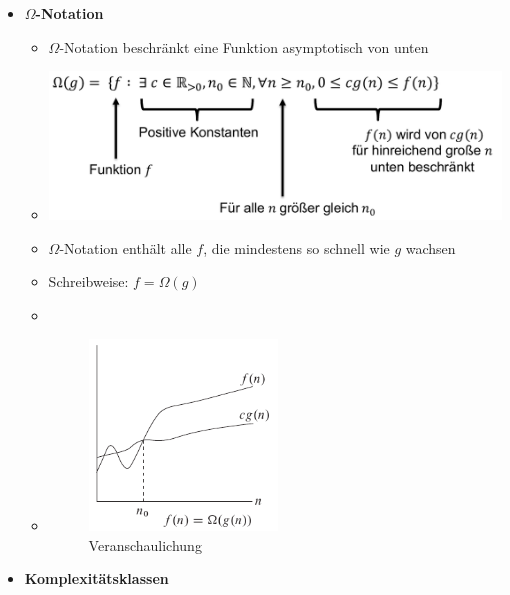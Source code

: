 \documentclass[
    12pt,
    a4paper,
    ngerman,
    color=3b,%
    marginpar=false,
    colorback=false,
    leqno,
]{tudaexercise}
\begin{document}
\begin{itemize}
    \item \textbf{$\Omega$-Notation}
          \begin{itemize}
              \item $\Omega$-Notation beschränkt eine Funktion asymptotisch von unten
              \item[] \includegraphics[width=12cm]{pictures/omegaNotation.pdf}
              \item $\Omega$-Notation enthält alle $f$, die mindestens so schnell wie $g$ wachsen
              \item Schreibweise: $f = \Omega(g)$
              \item[]
              \item[]
                    \begin{minipage}{0.3\textwidth}
                        \begin{figure}[H]
                            \centering
                            \includegraphics[width=5cm]{pictures/omegaNotationGraph.pdf}
                            \caption{Veranschaulichung}
                            \label{}
                        \end{figure}
                    \end{minipage}
                    \begin{minipage}[t]{0.6\textwidth}
                        \vspace{-3cm}
                    \end{minipage}
          \end{itemize}
          \clearpage
    \item \textbf{Komplexitätsklassen}

\end{itemize}
\end{document}
